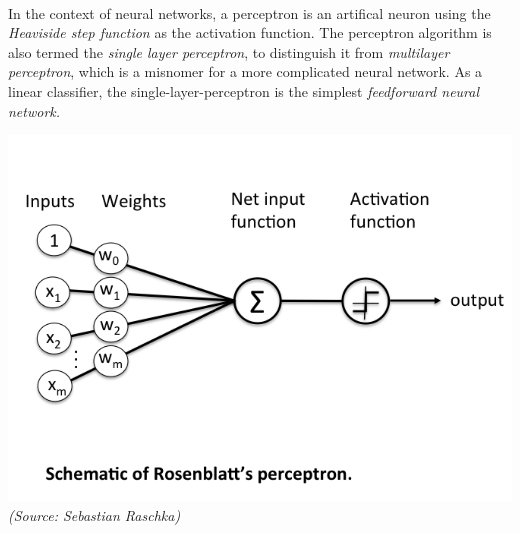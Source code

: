 \\
In the context of neural networks, a perceptron is an artifical neuron using the \textit{Heaviside step function} as the activation function. The perceptron algorithm is also termed the \textit{single layer perceptron}, to distinguish it from \textit{multilayer perceptron}, which is a misnomer for a more complicated neural network. As a linear classifier, the single-layer-perceptron is the simplest \textit{feedforward neural network.}\\
\begin{center}
\includegraphics[scale=0.5]{perceptron}\\
\textit{(Source: Sebastian Raschka)}
\end{center}
